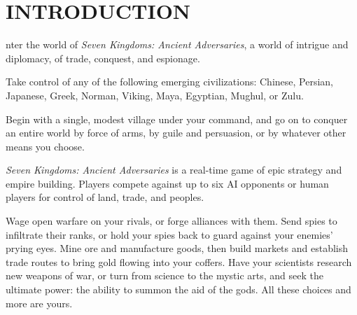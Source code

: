 
\chapter[Introduction]{{\Huge I}NTRODUCTION}

nter the world of \textit{Seven Kingdoms: Ancient Adversaries}, a world of intrigue and diplomacy, of trade, conquest, and espionage.


Take control of any of the following emerging civilizations: Chinese, Persian, Japanese, Greek, Norman, Viking, Maya, Egyptian, Mughul, or Zulu.

Begin with a single, modest village under your command, and go on to conquer an entire world by force of arms, by guile and persuasion, or by whatever other means you choose.

\textit{Seven Kingdoms: Ancient Adversaries} is a real-time game of epic strategy and empire building. Players compete against up to six AI opponents or human players for control of land, trade, and peoples.

Wage open warfare on your rivals, or forge alliances with them. Send spies to infiltrate their ranks, or hold your spies back to guard against your enemies’ prying eyes. Mine ore and manufacture goods, then build markets and establish trade routes to bring gold flowing into your coffers. Have your scientists research new weapons of war, or turn from science to the mystic arts, and seek the ultimate power: the ability to summon the aid of the gods. All these choices and more are yours.